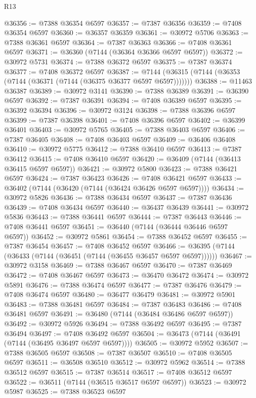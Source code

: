 \begin{lexlean}{R13}
\begin{coremodule}
@36356 := @7388 @36354 @6597
@36357 := @7387 @36356
@36359 := @7408 @36354 @6597
@36360 := @36357 @36359
@36361 := @30972 @5706
@36363 := @7388 @36361 @6597
@36364 := @7387 @36363
@36366 := @7408 @36361 @6597
@36371 := @36360 (@7144 (@36364 @36366 @6597 @6597))
@36372 := @30972 @5731
@36374 := @7388 @36372 @6597
@36375 := @7387 @36374
@36377 := @7408 @36372 @6597
@36387 := @7144 (@36315 (@7144 (@36353 (@7144 (@36371 (@7144 (@36375 @36377 @6597 @6597)))))))
@36388 := @11463 @36387
@36389 := @30972 @3141
@36390 := @7388 @36389
@36391 := @36390 @6597
@36392 := @7387 @36391
@36394 := @7408 @36389 @6597
@36395 := @36392 @36394
@36396 := @30972 @3124
@36398 := @7388 @36396 @6597
@36399 := @7387 @36398
@36401 := @7408 @36396 @6597
@36402 := @36399 @36401
@36403 := @30972 @5765
@36405 := @7388 @36403 @6597
@36406 := @7387 @36405
@36408 := @7408 @36403 @6597
@36409 := @36406 @36408
@36410 := @30972 @5775
@36412 := @7388 @36410 @6597
@36413 := @7387 @36412
@36415 := @7408 @36410 @6597
@36420 := @36409 (@7144 (@36413 @36415 @6597 @6597))
@36421 := @30972 @5800
@36423 := @7388 @36421 @6597
@36424 := @7387 @36423
@36426 := @7408 @36421 @6597
@36433 := @36402 (@7144 (@36420 (@7144 (@36424 @36426 @6597 @6597))))
@36434 := @30972 @5826
@36436 := @7388 @36434 @6597
@36437 := @7387 @36436
@36439 := @7408 @36434 @6597
@36440 := @36437 @36439
@36441 := @30972 @5836
@36443 := @7388 @36441 @6597
@36444 := @7387 @36443
@36446 := @7408 @36441 @6597
@36451 := @36440 (@7144 (@36444 @36446 @6597 @6597))
@36452 := @30972 @5861
@36454 := @7388 @36452 @6597
@36455 := @7387 @36454
@36457 := @7408 @36452 @6597
@36466 := @36395 (@7144 (@36433 (@7144 (@36451 (@7144 (@36455 @36457 @6597 @6597))))))
@36467 := @30972 @3158
@36469 := @7388 @36467 @6597
@36470 := @7387 @36469
@36472 := @7408 @36467 @6597
@36473 := @36470 @36472
@36474 := @30972 @5891
@36476 := @7388 @36474 @6597
@36477 := @7387 @36476
@36479 := @7408 @36474 @6597
@36480 := @36477 @36479
@36481 := @30972 @5901
@36483 := @7388 @36481 @6597
@36484 := @7387 @36483
@36486 := @7408 @36481 @6597
@36491 := @36480 (@7144 (@36484 @36486 @6597 @6597))
@36492 := @30972 @5926
@36494 := @7388 @36492 @6597
@36495 := @7387 @36494
@36497 := @7408 @36492 @6597
@36504 := @36473 (@7144 (@36491 (@7144 (@36495 @36497 @6597 @6597))))
@36505 := @30972 @5952
@36507 := @7388 @36505 @6597
@36508 := @7387 @36507
@36510 := @7408 @36505 @6597
@36511 := @36508 @36510
@36512 := @30972 @5962
@36514 := @7388 @36512 @6597
@36515 := @7387 @36514
@36517 := @7408 @36512 @6597
@36522 := @36511 (@7144 (@36515 @36517 @6597 @6597))
@36523 := @30972 @5987
@36525 := @7388 @36523 @6597

\end{coremodule}
\end{lexlean}
